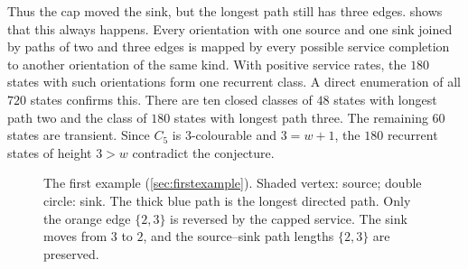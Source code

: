 \documentclass[11pt,a4paper]{article}
\theoremstyle{plain}
\theoremstyle{plain}
\newcommand{\empt}{\varnothing}
\begin{document}
Thus the cap moved the sink, but the longest path still has three edges.  shows that this always happens. Every orientation with one source and one sink joined by paths of two and three edges is mapped by every possible service completion to another orientation of the same kind. With positive service rates, the $180$ states with such orientations form one recurrent class. A direct enumeration of all $720$ states confirms this. There are ten closed classes of $48$ states with longest path two and the class of $180$ states with longest path three. The remaining $60$ states are transient. Since $C_5$ is $3$-colourable and $3=w+1$, the $180$ recurrent states of height $3>w$ contradict the conjecture.

\begin{figure}[t]
\centering
{}
\caption{The first example (\cref{sec:firstexample}). Shaded vertex: source; double circle: sink. The thick blue path is the longest directed path. Only the orange edge $\{2,3\}$ is reversed by the capped service. The sink moves from $3$ to $2$, and the source--sink path lengths $\{2,3\}$ are preserved.}
\label{fig:c5}
\end{figure}
\end{document}
